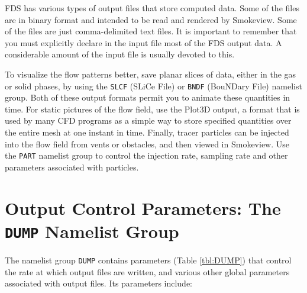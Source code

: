 \documentclass[11pt]{book}
\newcommand{\ct}{\tt\small}
\begin{document}
FDS has various types of output files that store computed data. Some of the files are in binary format and intended to be read and
rendered by Smokeview. Some of the files are just comma-delimited text files. It is important to remember that you must explicitly declare in
the input file most of the FDS output data. A considerable amount of the input file is usually devoted to this.

To visualize the flow patterns better, save planar
slices of data, either in the gas or solid phases, by using the
{\ct SLCF} (SLiCe File) or {\ct BNDF} (BouNDary File) namelist group.
Both of these output formats permit you to animate these quantities in
time. For static pictures of the flow field, use the Plot3D output, a format that is used by many CFD programs as a simple
way to store specified quantities over the entire mesh at one instant in time.
Finally, tracer particles can be injected into the flow field from
vents or obstacles, and then viewed in Smokeview. Use the {\ct PART}
namelist group to control the injection rate, sampling rate and other
parameters associated with particles.


\section{Output Control Parameters: The \texorpdfstring{{\tt DUMP}}{DUMP} Namelist Group}
\label{info:DUMP}

The namelist group {\ct DUMP} contains parameters (Table \ref{tbl:DUMP}) that control the rate at which output files
are written, and various other global parameters associated with output files. Its parameters include:
\end{document}
